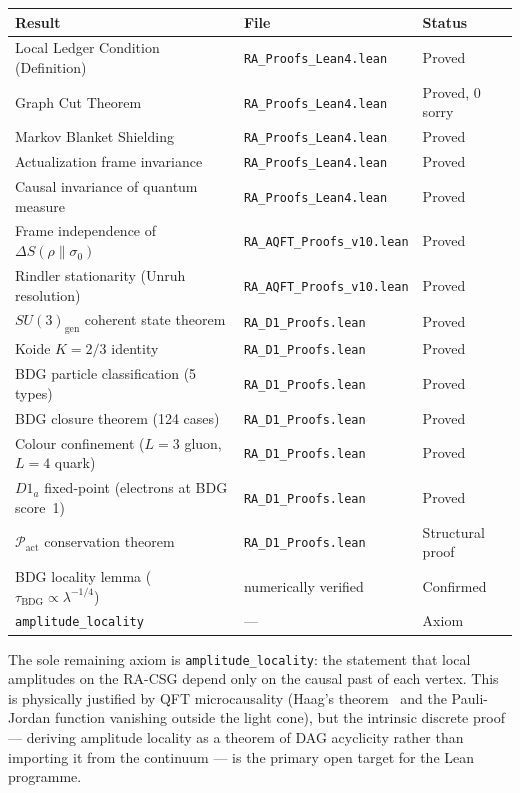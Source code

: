 \documentclass[11pt,a4paper]{article}
\newcommand{\Pact}{\mathcal{P}_{\mathrm{act}}}
\begin{document}
\begin{center}
\renewcommand{\arraystretch}{1.2}
\begin{tabular}{p{5.5cm}p{4cm}p{2.5cm}}
\toprule
Result & File & Status \\
\midrule
Local Ledger Condition (Definition) & \texttt{RA\_Proofs\_Lean4.lean} & Proved \\
Graph Cut Theorem & \texttt{RA\_Proofs\_Lean4.lean} & Proved, 0 sorry \\
Markov Blanket Shielding & \texttt{RA\_Proofs\_Lean4.lean} & Proved \\
Actualization frame invariance & \texttt{RA\_Proofs\_Lean4.lean} & Proved \\
Causal invariance of quantum measure & \texttt{RA\_Proofs\_Lean4.lean} & Proved \\
Frame independence of $\Delta S(\rho\|\sigma_0)$ & \texttt{RA\_AQFT\_Proofs\_v10.lean} & Proved \\
Rindler stationarity (Unruh resolution) & \texttt{RA\_AQFT\_Proofs\_v10.lean} & Proved \\
$SU(3)_{\mathrm{gen}}$ coherent state theorem & \texttt{RA\_D1\_Proofs.lean} & Proved \\
Koide $K = 2/3$ identity & \texttt{RA\_D1\_Proofs.lean} & Proved \\
BDG particle classification (5 types) & \texttt{RA\_D1\_Proofs.lean} & Proved \\
BDG closure theorem (124 cases) & \texttt{RA\_D1\_Proofs.lean} & Proved \\
Colour confinement ($L{=}3$ gluon, $L{=}4$ quark) & \texttt{RA\_D1\_Proofs.lean} & Proved \\
$D1_a$ fixed-point (electrons at BDG score~1) & \texttt{RA\_D1\_Proofs.lean} & Proved \\
$\Pact$ conservation theorem & \texttt{RA\_D1\_Proofs.lean} & Structural proof \\
BDG locality lemma ($\tau_{\mathrm{BDG}} \propto \lambda^{-1/4}$) & numerically verified & Confirmed \\
\midrule
\texttt{amplitude\_locality} & --- & Axiom \\
\bottomrule
\end{tabular}
\end{center}

\noindent
The sole remaining axiom is \texttt{amplitude\_locality}: the statement
that local amplitudes on the RA-CSG depend only on the causal past of
each vertex. This is physically justified by QFT microcausality (Haag's
theorem~\citep{Haag1996} and the Pauli-Jordan function vanishing outside
the light cone), but the intrinsic discrete proof --- deriving amplitude
locality as a theorem of DAG acyclicity rather than importing it from
the continuum --- is the primary open target for the Lean programme.
\end{document}
